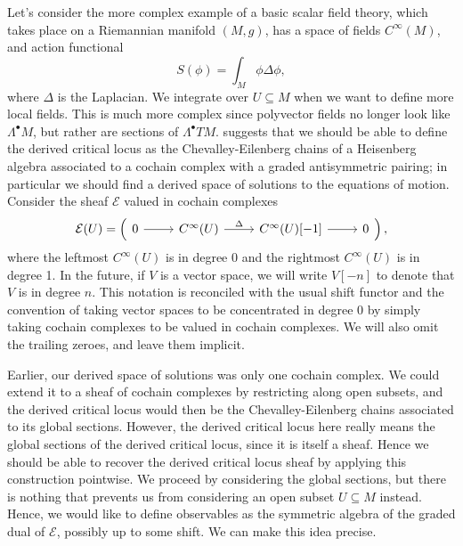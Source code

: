\begin{example}\label{4.2.1}	
Let's consider the more complex example of a basic scalar field theory, which takes place on a Riemannian manifold $(M,g)$, has a space of fields $C^\infty (M)$, and action functional
\[
	S(\phi )=\int_{M} \phi \Delta \phi ,
\]
where $\Delta $ is the Laplacian. We integrate over $U\subseteq M$ when we want to define more local fields. This is much more complex since polyvector fields no longer look like $\Lambda ^{\bullet} M$, but rather are sections of $\Lambda ^{\bullet} TM$.  suggests that we should be able to define the derived critical locus as the Chevalley-Eilenberg chains of a Heisenberg algebra associated to a cochain complex with a graded antisymmetric pairing; in particular we should find a derived space of solutions to the equations of motion. Consider the sheaf $\mathcal{E} $ valued in cochain complexes
\[
	\mathcal{E}(U) = \left( 
		\begin{tikzcd}
			0\ar[r] & C^\infty (U)\ar[" \Delta  ", r] & C^\infty (U)[-1] \ar[r] & 0
		\end{tikzcd}
	\right) ,
\]
where the leftmost $C^\infty (U)$ is in degree 0 and the rightmost $C^\infty (U)$ is in degree 1. In the future, if $V$ is a vector space, we will write $V[-n]$ to denote that $V$ is in degree $n$. This notation is reconciled with the usual shift functor and the convention of taking vector spaces to be concentrated in degree 0 by simply taking cochain complexes to be valued in cochain complexes. We will also omit the trailing zeroes, and leave them implicit.

Earlier, our derived space of solutions was only one cochain complex. We could extend it to a sheaf of cochain complexes by restricting along open subsets, and the derived critical locus would then be the Chevalley-Eilenberg chains associated to its global sections. However, the derived critical locus here really means the global sections of the derived critical locus, since it is itself a sheaf. Hence we should be able to recover the derived critical locus sheaf by applying this construction pointwise. We proceed by considering the global sections, but there is nothing that prevents us from considering an open subset $U\subseteq M$ instead. Hence, we would like to define observables as the symmetric algebra of the graded dual of $\mathcal{E} $, possibly up to some shift. We can make this idea precise.


\end{example}
